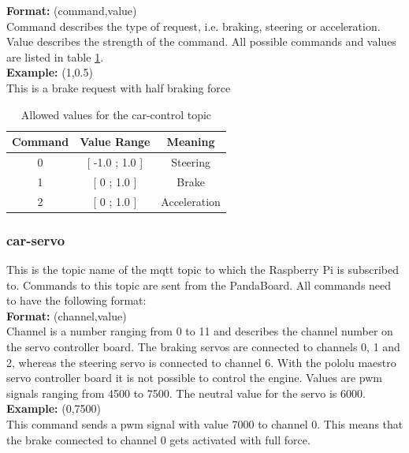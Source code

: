 \textbf{Format:} (command,value) \\
Command describes the type of request, i.e. braking, steering or acceleration. Value describes the strength of the command. All possible commands and values are listed in table \ref{tab:car-control}. \\

\textbf{Example:} (1,0.5) \\
This is a brake request with half braking force \\

\begin{table}[h]
    \centering
    \begin{tabular}{c | c | c}
        \textbf{Command} & \textbf{Value Range} & \textbf{Meaning} \\ \hline
        0   &   [ -1.0 ; 1.0 ]    & Steering \\
        1   &   [ 0 ; 1.0 ]       & Brake \\ 
        2   &   [ 0 ; 1.0 ]       & Acceleration \\ 
    \end{tabular}
    \caption{Allowed values for the car-control topic}
    \label{tab:car-control}
\end{table}


\subsubsection{car-servo}
This is the topic name of the mqtt topic to which the Raspberry Pi is subscribed to. Commands to this topic are sent from the PandaBoard. All commands need to have the following format: \\ 

\textbf{Format:} (channel,value) \\
Channel is a number ranging from 0 to 11 and describes the channel number on the servo controller board. The braking servos are connected to channels 0, 1 and 2, whereas the steering servo is connected to channel 6. With the pololu maestro servo controller board it is not possible to control the engine. Values are pwm signals ranging from 4500 to 7500. The neutral value for the servo is 6000. \\

\textbf{Example:} (0,7500) \\
This command sends a pwm signal with value 7000 to channel 0. This means that the brake connected to channel 0 gets activated with full force. 

\newpage
